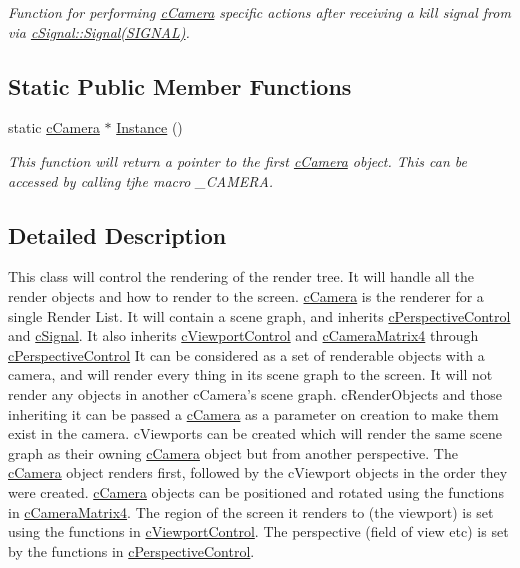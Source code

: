 \begin{DoxyCompactItemize}
\begin{DoxyCompactList}\small\item\em Function for performing \hyperlink{classc_camera}{cCamera} specific actions after receiving a kill signal from via \hyperlink{classc_signal_a545074be1da41d00050bed3cd2fb2305}{cSignal::Signal(SIGNAL)}. \end{DoxyCompactList}\end{DoxyCompactItemize}
\subsection*{Static Public Member Functions}
\begin{DoxyCompactItemize}
\item 
\hypertarget{classc_camera_a06efab78c09ce37c375837242719bf58}{
static \hyperlink{classc_camera}{cCamera} $\ast$ \hyperlink{classc_camera_a06efab78c09ce37c375837242719bf58}{Instance} ()}
\label{classc_camera_a06efab78c09ce37c375837242719bf58}

\begin{DoxyCompactList}\small\item\em This function will return a pointer to the first \hyperlink{classc_camera}{cCamera} object. This can be accessed by calling tjhe macro \_\-CAMERA. \end{DoxyCompactList}\end{DoxyCompactItemize}


\subsection{Detailed Description}
This class will control the rendering of the render tree. It will handle all the render objects and how to render to the screen. \hyperlink{classc_camera}{cCamera} is the renderer for a single Render List. It will contain a scene graph, and inherits \hyperlink{classc_perspective_control}{cPerspectiveControl} and \hyperlink{classc_signal}{cSignal}. It also inherits \hyperlink{classc_viewport_control}{cViewportControl} and \hyperlink{classc_camera_matrix4}{cCameraMatrix4} through \hyperlink{classc_perspective_control}{cPerspectiveControl} It can be considered as a set of renderable objects with a camera, and will render every thing in its scene graph to the screen. It will not render any objects in another cCamera's scene graph. cRenderObjects and those inheriting it can be passed a \hyperlink{classc_camera}{cCamera} as a parameter on creation to make them exist in the camera. cViewports can be created which will render the same scene graph as their owning \hyperlink{classc_camera}{cCamera} object but from another perspective. The \hyperlink{classc_camera}{cCamera} object renders first, followed by the cViewport objects in the order they were created. \hyperlink{classc_camera}{cCamera} objects can be positioned and rotated using the functions in \hyperlink{classc_camera_matrix4}{cCameraMatrix4}. The region of the screen it renders to (the viewport) is set using the functions in \hyperlink{classc_viewport_control}{cViewportControl}. The perspective (field of view etc) is set by the functions in \hyperlink{classc_perspective_control}{cPerspectiveControl}. 